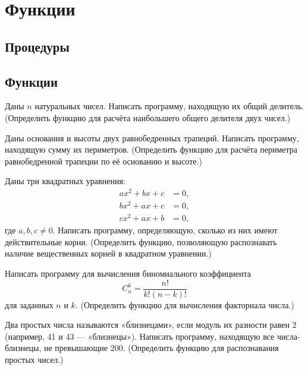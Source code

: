 \section{Функции}

\subsection{Процедуры}

\task 

\task

\task

\task

\task

\task

\task

\task

\task

\task 

\subsection{Функции}

\task Даны $n$ натуральных чисел. Написать программу, находящую их
общий делитель. (Определить функцию для расчёта наибольшего общего
делителя двух чисел.)

\task Даны основания и высоты двух равнобедренных трапеций. Написать
программу, находящую сумму их периметров. (Определить функцию для
расчёта периметра равнобедренной трапеции по её основанию и высоте.)

\task Даны три квадратных уравнения:
\begin{align*}
a x^2 + b x + c &= 0,\\
b x^2 + a x + c &= 0,\\
c x^2 + a x + b &= 0,
\end{align*}
где $a,b,c\neq 0.$
Написать программу, определяющую, сколько из них имеют действительные
корни. (Определить функцию, позволяющую распознавать наличие
вещественных корней в квадратном уравнении.)

\task Написать программу для вычисления биномиального коэффициента
\[
C_n^k = \frac{n!}{k!(n-k)!}
\]
для заданных $n$ и $k$. (Определить функцию для вычисления факториала
числа.)

\task Два простых числа называются «близнецами», если модуль их
разности равен 2 (например, 41 и 43 — «близнецы»). Написать программу,
находящую все числа-близнецы, не превышающие $200$. (Определить
функцию для распознавания простых чисел.)

